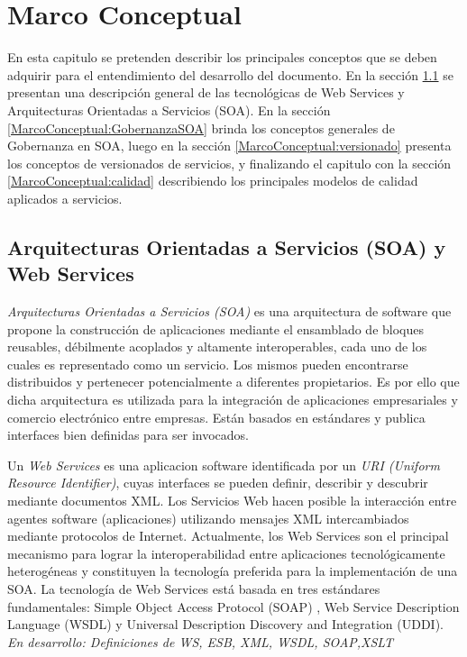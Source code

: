 \chapter{Marco Conceptual}
\label{MarcoConceptual}
En esta capitulo se pretenden describir los principales conceptos que se deben adquirir para el entendimiento del desarrollo del documento. En la sección \ref{MarcoConceptual:SOA_WSDL} se presentan una descripción general de las tecnológicas de Web Services y Arquitecturas Orientadas a Servicios (SOA). En la sección \ref{MarcoConceptual:GobernanzaSOA} brinda los conceptos generales de Gobernanza en SOA, luego en la sección \ref{MarcoConceptual:versionado} presenta los conceptos de versionados de servicios, y finalizando el capitulo con la sección \ref{MarcoConceptual:calidad} describiendo los principales modelos de calidad aplicados a servicios.

\section{Arquitecturas Orientadas a Servicios (SOA) y Web Services}
\label{MarcoConceptual:SOA_WSDL}
\emph{Arquitecturas Orientadas a Servicios (SOA)} es una arquitectura de software que propone la construcción de aplicaciones mediante el ensamblado de bloques reusables, débilmente acoplados y altamente interoperables, cada uno de los cuales es representado como un servicio.  Los mismos pueden encontrarse distribuidos y pertenecer potencialmente a diferentes propietarios. Es por ello que dicha arquitectura es utilizada para la integración de aplicaciones empresariales y comercio electrónico entre empresas. Están basados en estándares y publica interfaces bien definidas para ser invocados.

Un \emph{Web Services} es una aplicacion software identificada por un \emph{URI (Uniform Resource Identifier)}, cuyas interfaces se pueden definir, describir y descubrir mediante documentos XML. Los Servicios Web hacen posible la interacción entre agentes software (aplicaciones) utilizando mensajes XML intercambiados mediante protocolos de Internet.
Actualmente, los Web Services son el principal mecanismo para lograr la interoperabilidad
entre aplicaciones tecnológicamente heterogéneas y constituyen la tecnología preferida para
la implementación de una SOA.
La tecnología de Web Services está basada en tres estándares fundamentales: Simple Object
Access Protocol (SOAP) , Web Service Description Language (WSDL) y Universal
Description Discovery and Integration (UDDI).
\emph{En desarrollo: Definiciones de WS, ESB, XML, WSDL, SOAP,XSLT}



